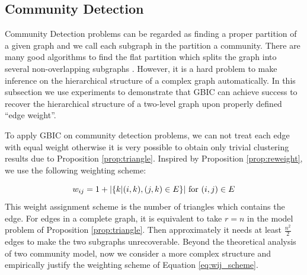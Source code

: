 \subsection{Community Detection}\label{subsec:cd}
Community Detection problems can be regarded as finding a proper partition of a given graph and we call each subgraph in the partition a community. There are many good algorithms
to find the flat partition which splits the graph into several non-overlapping subgraphs \citep{malliaros2013clustering}. However, it is a hard problem to make inference on the hierarchical structure of a complex graph automatically.
In this subsection we use experiments to demonstrate that GBIC
can achieve success to recover the hierarchical structure of a two-level graph upon properly defined ``edge weight''.

To apply GBIC on community detection problems, we can not treat each edge with equal weight otherwise it is very possible to obtain only trivial clustering results due to Proposition \ref{prop:triangle}. Inspired by Proposition \ref{prop:reweight}, we use the following weighting scheme:

\begin{equation}\label{eq:wij_scheme}
    w_{ij} = 1 + \lvert\{k | (i,k),(j,k) \in E \}\rvert \textrm{ for } (i,j) \in E
\end{equation}
This weight assignment scheme is the number of triangles which contains the edge. For edges in a complete graph, it is equivalent to take $r=n$ in the model problem of Proposition \ref{prop:triangle}. Then approximately it needs
at least $\frac{n^2}{2}$ edges to make the two subgraphs unrecoverable.
Beyond the theoretical analysis of two community model, now we consider a more complex structure and empirically justify the weighting scheme of Equation 
\eqref{eq:wij_scheme}.

